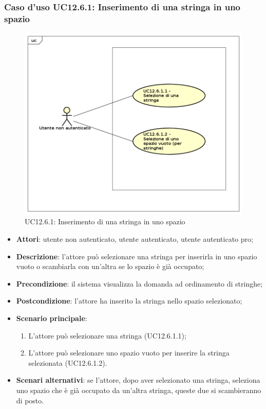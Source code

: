 \subsubsection{Caso d'uso UC12.6.1: Inserimento di una stringa in uno spazio}
\label{UC12.6.1}
\begin{figure}[h]
	\centering
	\includegraphics[scale=0.5]{UML/UC12_6_1.png}
	\caption{UC12.6.1: Inserimento di una stringa in uno spazio}
\end{figure}
\begin{itemize}
\item \textbf{Attori}: utente non autenticato, utente autenticato, utente autenticato pro;
\item \textbf{Descrizione}: l'attore può selezionare una stringa per inserirla in uno spazio vuoto o scambiarla con un'altra se lo spazio è già occupato;
\item \textbf{Precondizione}: il sistema visualizza la domanda ad ordinamento di stringhe;
\item \textbf{Postcondizione}: l'attore ha inserito la stringa nello spazio selezionato;
\item \textbf{Scenario principale}: 
\begin{enumerate}
\item L'attore può selezionare una stringa (UC12.6.1.1);
\item L'attore può selezionare uno spazio vuoto per inserire la stringa selezionata (UC12.6.1.2).
\end{enumerate}
\item \textbf{Scenari alternativi}: se l'attore, dopo aver selezionato una stringa, seleziona uno spazio che è già occupato da un'altra stringa, queste due si scambieranno di posto.
\end{itemize}

